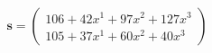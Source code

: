 \documentclass[preview]{standalone}
\begin{document}
\begin{align*}
\mathbf{s} = \begin{pmatrix}106 + 42x^{1} + 97x^{2} + 127x^{3} \\ 105 + 37x^{1} + 60x^{2} + 40x^{3}\end{pmatrix}
\end{align*}
\end{document}
